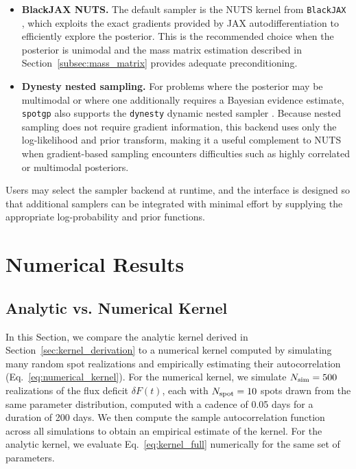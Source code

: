 \documentclass[preprint]{aastex702}
\newcommand{\code}[1]{{\texttt{#1}}}
\begin{document}
\begin{itemize}
    \item \textbf{BlackJAX NUTS.} The default sampler is the NUTS kernel from \code{BlackJAX} \citep{lao_blackjax_2020}, which exploits the exact gradients provided by JAX autodifferentiation to efficiently explore the posterior. This is the recommended choice when the posterior is unimodal and the mass matrix estimation described in Section~\ref{subsec:mass_matrix} provides adequate preconditioning.

    \item \textbf{Dynesty nested sampling.} For problems where the posterior may be multimodal or where one additionally requires a Bayesian evidence estimate, \code{spotgp} also supports the \code{dynesty} dynamic nested sampler \citep{speagle_dynesty_2020}. Because nested sampling does not require gradient information, this backend uses only the log-likelihood and prior transform, making it a useful complement to NUTS when gradient-based sampling encounters difficulties such as highly correlated or multimodal posteriors.
\end{itemize}

Users may select the sampler backend at runtime, and the interface is designed so that additional samplers can be integrated with minimal effort by supplying the appropriate log-probability and prior functions.


\vspace{\baselineskip}
\section{Numerical Results} \label{sec:results}

\subsection{Analytic vs. Numerical Kernel} \label{sec:analytic_vs_numerical}

In this Section, we compare the analytic kernel derived in Section~\ref{sec:kernel_derivation} to a numerical kernel computed by simulating many random spot realizations and empirically estimating their autocorrelation (Eq.~\ref{eq:numerical_kernel}). For the numerical kernel, we simulate $N_{\rm sim} = 500$ realizations of the flux deficit $\delta F(t)$, each with $N_{\rm spot} = 10$ spots drawn from the same parameter distribution, computed with a cadence of 0.05 days for a duration of 200 days. We then compute the sample autocorrelation function across all simulations to obtain an empirical estimate of the kernel. For the analytic kernel, we evaluate Eq.~\eqref{eq:kernel_full} numerically for the same set of parameters.
\end{document}
